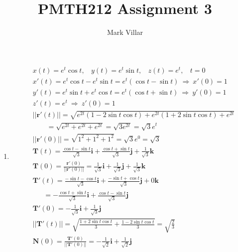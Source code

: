 \documentclass[12pt]{amsart}
\title{PMTH212 Assignment 3}
\author{Mark Villar}
\begin{document}
 

\maketitle 

\begin{enumerate}
	
	\item
		\begin{align*}
			&x(t)=e^t\cos t, \ \ \ \ y(t)=e^t\sin t, \ \ \ \ z(t)=e^t, \ \ \ \ t=0 \\
			&x'(t)=e^t\cos t-e^t\sin t=e^t(\cos t-\sin t) \ \Rightarrow \ x'(0)=1 \\
			&y'(t)=e^t\sin t+e^t\cos t=e^t(\cos t+\sin t) \ \Rightarrow \ y'(0)=1 \\ 
			&z'(t)=e^t \ \Rightarrow \ z'(0)=1 \\
			&||\mathbf{r}'(t)||=\sqrt{e^{2t}(1-2\sin t\cos t)+e^{2t}(1+2\sin t\cos t)+e^{2t}} \\
			&\ \ \ \ \ \ \ \ \ =\sqrt{e^{2t}+e^{2t}+e^{2t}}=\sqrt{3e^{2t}}=\sqrt{3}e^t \\
			&||\mathbf{r}'(0)||=\sqrt{1^2+1^2+1^2}=\sqrt{3}e^0=\sqrt{3} \\
			&\mathbf{T}(t)=\frac{\cos t-\sin t}{\sqrt{3}}\mathbf{i}+\frac{\cos t+\sin t}{\sqrt{3}}\mathbf{j}+\frac{1}
			{\sqrt{3}}\mathbf{k} \\
			&\mathbf{T}(0)=\frac{\mathbf{r}'(0)}{||\mathbf{r}'(0)||}=\frac{1}{\sqrt{3}}\mathbf{i}+\frac{1}{\sqrt{3}}			\mathbf{j}+\frac{1}{\sqrt{3}}\mathbf{k} \\
			&\mathbf{T}'(t)=\frac{-\sin t-\cos t}{\sqrt{3}}\mathbf{i}+\frac{-\sin t+\cos t}{\sqrt{3}}\mathbf{j}+0				\mathbf{k} \\
			&\ \ \ \ \ \ \ =-\frac{\cos t+\sin t}{\sqrt{3}}\mathbf{i}+\frac{\cos t-\sin t}{\sqrt{3}}\mathbf{j} \\
			&\mathbf{T}'(0)=-\frac{1}{\sqrt{3}}\mathbf{i}+\frac{1}{\sqrt{3}}\mathbf{j} \\
			&||\mathbf{T}'(t)||=\sqrt{\frac{1+2\sin t \cos t}{3}+\frac{1-2\sin t \cos t}{3}}=\sqrt{\frac{2}{3}} \\
			&\mathbf{N}(0)=\frac{\mathbf{T}'(0)}{||\mathbf{T}'(0)||}=-\frac{1}{\sqrt{2}}\mathbf{i}+\frac{1}{\sqrt{2}}			\mathbf{j}
		\end{align*}
		

\end{enumerate}
\end{document}

